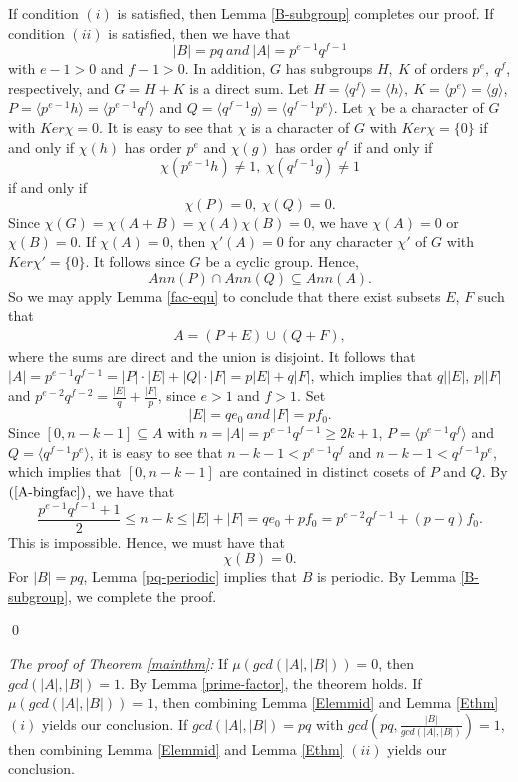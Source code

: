 \documentclass[preprint]{elsarticle}
\begin{document}
\pf
If condition $(i)$ is satisfied, then
Lemma \ref{B-subgroup} completes our proof.
If condition $(ii)$ is satisfied, then
we have that $$|B|=pq\ and \ |A|=p^{e-1}q^{f-1}$$
with $e-1>0$ and $f-1>0$.
In addition, $G$ has subgroups $H,\ K$ of orders $p^e,\ q^f$, respectively, and $G = H + K$ is a direct sum.
Let $H =\langle q^f\rangle= \langle h\rangle,\ K = \langle p^e\rangle= \langle g\rangle$,
$P = \langle p^{e-1}h\rangle= \langle p^{e-1}q^f\rangle$ and $Q = \langle q^{f-1}g\rangle= \langle q^{f-1}p^e\rangle$.
Let $\chi$ be a character of $G$ with $Ker\chi ={0}$.
It is easy to see that $\chi$ is a character of $G$ with $Ker\chi = \{0\}$ if and only if
$\chi(h)$ has order $p^e$ and $\chi(g)$ has order $q^f$ if and only if
$$\chi(p^{e-1}h)\neq 1,\ \chi(q^{f-1}g)\neq 1$$ if and only if
$$\chi(P) = 0,\ \chi(Q) = 0.$$
Since $\chi(G)=\chi(A+B)=\chi(A)\chi(B)=0$,
we have $\chi(A)=0$ or $\chi(B)=0$.
If $\chi(A)=0$, then $\chi'(A)=0$ for any character $\chi'$ of $G$ with $Ker\chi' = \{0\}$.
It follows since $G$ be a cyclic group.
Hence, $$Ann(P)\cap Ann(Q)\subseteq Ann(A).$$
So we may apply Lemma \ref{fac-equ} to conclude that there exist subsets $E$, $F$ such that
\begin{gather}
A = (P + E)\cup(Q + F),   \label{A-bingfac}
\end{gather}
where the sums are direct and the union is disjoint.
It follows that $|A|=p^{e-1}q^{f-1}=|P|\cdot |E|+|Q|\cdot |F|=p|E|+q|F|$, which implies that
$q||E|$, $p||F|$ and $p^{e-2}q^{f-2}=\frac{|E|}{q}+\frac{|F|}{p}$, since $e>1$ and $f>1$.
Set $$|E|=qe_0\ and \ |F|=pf_0.$$
Since $[0,n-k-1]\subseteq A$ with $n=|A|=p^{e-1}q^{f-1}\geq 2k+1$, $P = \langle p^{e-1}q^f\rangle$ and $Q = \langle q^{f-1}p^e\rangle$,
it is easy to see that $n-k-1<p^{e-1}q^f$ and $n-k-1<q^{f-1}p^e$, which implies that $[0,n-k-1]$ are contained in distinct cosets of $P$ and $Q$.
By $(\ref{A-bingfac})$, we have that $$\frac{p^{e-1}q^{f-1}+1}{2}\leq n-k\leq |E|+|F|=qe_0+pf_0=p^{e-2}q^{f-1}+(p-q)f_0.$$
This is impossible.
Hence, we must have that $$\chi(B) = 0.$$
For $|B|=pq$, Lemma \ref{pq-periodic} implies that $B$ is periodic.
By Lemma \ref{B-subgroup}, we complete the proof.

\qed

\textit{The proof of Theorem \ref{mainthm}:}
If $\mu(gcd(|A|,|B|))=0$, then $gcd(|A|,|B|)=1$.
By Lemma \ref{prime-factor}, the theorem holds.
If $\mu(gcd(|A|,|B|))=1$, then combining Lemma \ref{Elemmid} and Lemma \ref{Ethm} $(i)$ yields our conclusion.
If $gcd(|A|,|B|)=pq$ with $gcd(pq,\frac{|B|}{gcd(|A|,|B|)})=1$,
then combining Lemma \ref{Elemmid} and Lemma \ref{Ethm} $(ii)$ yields our conclusion.
\end{document}
